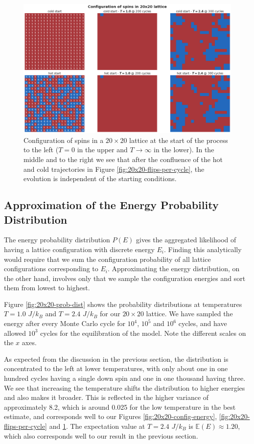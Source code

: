 \documentclass[]{article}
\begin{document}
\begin{figure}[!h]
	\centering
	\includegraphics[width=1\linewidth]{./figs/20x20-config-spins.png}
	\caption{Configuration of spins in a $20 \times 20$ lattice at the start of the process to the left ($T=0$ in the upper and $T \rightarrow \infty$ in the lower). In the middle and to the right we see that after the confluence of the hot and cold trajectories in Figure \ref{fig:20x20-flips-per-cycle}, the evolution is independent of the starting conditions.}
	\label{fig:20x20-config-spins}
\end{figure}

\subsection{Approximation of the Energy Probability Distribution} \label{sec:prob-dist}
The energy probability distribution $P(E)$ gives the aggregated likelihood of having a lattice configuration with discrete energy $E_i$. Finding this analytically would require that we sum the configuration probability of all lattice configurations corresponding to $E_i$. Approximating the energy distribution, on the other hand, involves only that we sample the configuration energies and sort them from lowest to highest. 

Figure \ref{fig:20x20-prob-dist} shows the probability distributions at temperatures $T = 1.0$ $J/k_B$ and $T = 2.4$ $J/k_B$ for our $20 \times 20$ lattice. We have sampled the energy after every Monte Carlo cycle for $10^4$, $10^5$ and $10^6$ cycles, and have allowed $10^3$ cycles for the equilibration of the model. Note the different scales on the $x$ axes. 

As expected from the discussion in the previous section, the distribution is concentrated to the left at lower temperatures, with only about one in one hundred cycles having a single down spin and one in one thousand having three. We see that increasing the temperature shifts the distribution to higher energies and also makes it broader. This is reflected in the higher variance of approximately 8.2, which is around 0.025 for the low temperature in the best estimate, and corresponds well to our Figures \ref{fig:20x20-config-energy}, \ref{fig:20x20-flips-per-cycle} and \ref{fig:20x20-config-spins}. The expectation value at $T = 2.4$ $J/k_B$ is $\mathbb{E}(E) \approx 1.20$, which also corresponds well to our result in the previous section.
\end{document}
